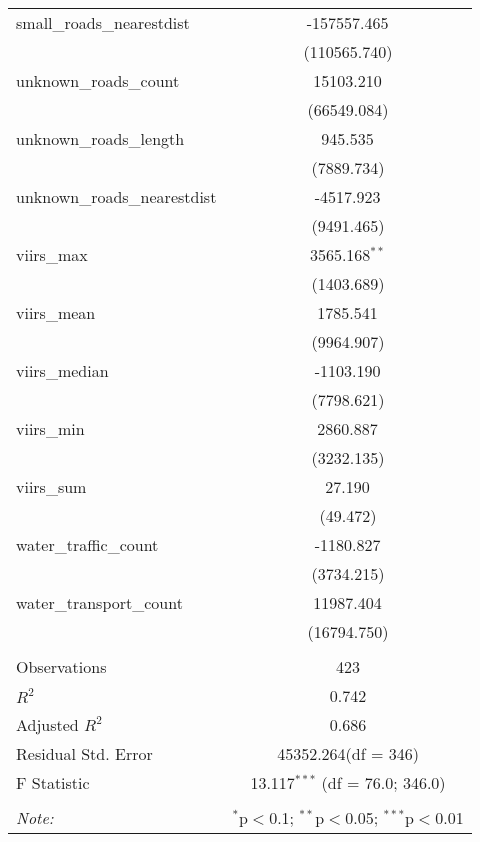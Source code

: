 \begin{table}[!htbp]
\begin{tabular}{@{\extracolsep{5pt}}lc}
 small_roads_nearestdist & -157557.465$^{}$ \\
  & (110565.740) \\
 unknown_roads_count & 15103.210$^{}$ \\
  & (66549.084) \\
 unknown_roads_length & 945.535$^{}$ \\
  & (7889.734) \\
 unknown_roads_nearestdist & -4517.923$^{}$ \\
  & (9491.465) \\
 viirs_max & 3565.168$^{**}$ \\
  & (1403.689) \\
 viirs_mean & 1785.541$^{}$ \\
  & (9964.907) \\
 viirs_median & -1103.190$^{}$ \\
  & (7798.621) \\
 viirs_min & 2860.887$^{}$ \\
  & (3232.135) \\
 viirs_sum & 27.190$^{}$ \\
  & (49.472) \\
 water_traffic_count & -1180.827$^{}$ \\
  & (3734.215) \\
 water_transport_count & 11987.404$^{}$ \\
  & (16794.750) \\
\hline \\[-1.8ex]
 Observations & 423 \\
 $R^2$ & 0.742 \\
 Adjusted $R^2$ & 0.686 \\
 Residual Std. Error & 45352.264(df = 346)  \\
 F Statistic & 13.117$^{***}$ (df = 76.0; 346.0) \\
\hline
\hline \\[-1.8ex]
\textit{Note:} & \multicolumn{1}{r}{$^{*}$p$<$0.1; $^{**}$p$<$0.05; $^{***}$p$<$0.01} \\
\end{tabular}
\end{table}